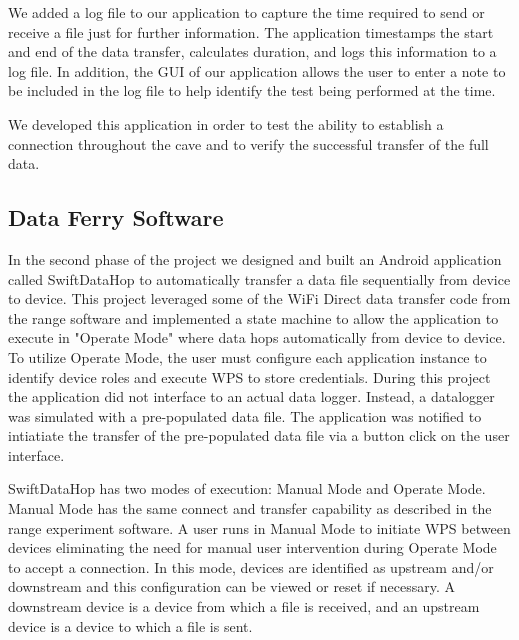\documentclass[10pt,twocolumn]{article}
\begin{document}
We added a log file to our application to capture the time required to send or receive a file just for further information.
The application timestamps the start and end of the data transfer, calculates duration, and logs this information to a log file.
In addition, the GUI of our application allows the user to enter a note to be included in the log file to help identify the test being performed at the time.

We developed this application in order to test the ability to establish a connection throughout the cave and to verify the successful transfer of the full data.

\subsection{Data Ferry Software}
\label{sec:Data Ferry Software}
In the second phase of the project we designed and built an Android application called SwiftDataHop to automatically transfer a data file sequentially from device to device. 
This project leveraged some of the WiFi Direct data transfer code from the range software and implemented a state machine to allow the application to execute in "Operate Mode" where data hops automatically from device to device. 
To utilize Operate Mode, the user must configure each application instance to identify device roles and execute WPS to store credentials.
During this project the application did not interface to an actual data logger.
Instead, a datalogger was simulated with a pre-populated data file.
The application was notified to intiatiate the transfer of the pre-populated data file via a button click on the user interface.

SwiftDataHop has two modes of execution: Manual Mode and Operate Mode.
Manual Mode has the same connect and transfer capability as described in the range experiment software.
A user runs in Manual Mode to initiate WPS between devices eliminating the need for manual user intervention during Operate Mode to accept a connection.
In this mode, devices are identified as upstream and/or downstream and this configuration can be viewed or reset if necessary.
A downstream device is a device from which a file is received, and an upstream device is a device to which a file is sent.
\end{document}
